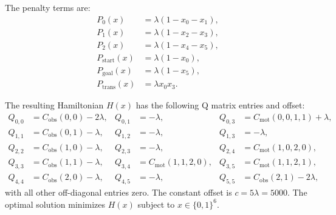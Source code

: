 \documentclass[12pt]{article}
\begin{document}
The penalty terms are:
\begin{align}
P_0(x) &= \lambda(1 - x_0 - x_1), \\
P_1(x) &= \lambda(1 - x_2 - x_3), \\
P_2(x) &= \lambda(1 - x_4 - x_5), \\
P_{\text{start}}(x) &= \lambda(1 - x_0), \\
P_{\text{goal}}(x) &= \lambda(1 - x_5), \\
P_{\text{trans}}(x) &= \lambda x_0 x_3.
\end{align}

The resulting Hamiltonian $H(x)$ has the following Q matrix entries and offset:
\begin{align}
Q_{0,0} &= C_{\text{obs}}(0,0) - 2\lambda, & Q_{0,1} &= -\lambda, & Q_{0,3} &= C_{\text{mot}}(0,0,1,1) + \lambda, \\
Q_{1,1} &= C_{\text{obs}}(0,1) - \lambda, & Q_{1,2} &= -\lambda, & Q_{1,3} &= -\lambda, \\
Q_{2,2} &= C_{\text{obs}}(1,0) - \lambda, & Q_{2,3} &= -\lambda, & Q_{2,4} &= C_{\text{mot}}(1,0,2,0), \\
Q_{3,3} &= C_{\text{obs}}(1,1) - \lambda, & Q_{3,4} &= C_{\text{mot}}(1,1,2,0), & Q_{3,5} &= C_{\text{mot}}(1,1,2,1), \\
Q_{4,4} &= C_{\text{obs}}(2,0) - \lambda, & Q_{4,5} &= -\lambda, & Q_{5,5} &= C_{\text{obs}}(2,1) - 2\lambda,
\end{align}
with all other off-diagonal entries zero. The constant offset is $c = 5\lambda = 5000$. The optimal solution minimizes $H(x)$ subject to $x \in \{0,1\}^6$.
\end{document}
